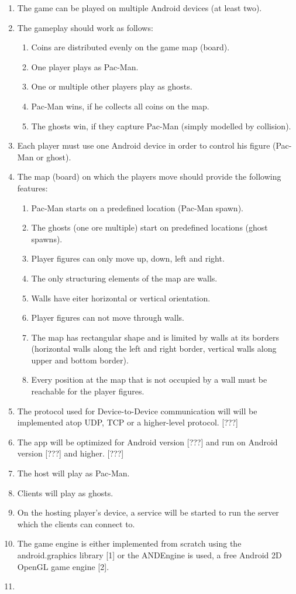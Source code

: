 \documentclass{report}
\begin{document}
\begin{enumerate}
	\item The game can be played on multiple Android devices (at least two).
	\item The gameplay should work as follows:
	\begin{enumerate}
		\item Coins are distributed evenly on the game map (board).
		\item One player plays as Pac-Man.
		\item One or multiple other players play as ghosts.
		\item Pac-Man wins, if he collects all coins on the map.
		\item The ghosts win, if they capture Pac-Man (simply modelled by collision).
	\end{enumerate}
	\item Each player must use one Android device in order to control his figure (Pac-Man or ghost).
	\item The map (board) on which the players move should provide the following features:
	\begin{enumerate}
		\item Pac-Man starts on a predefined location (Pac-Man spawn).
		\item The ghosts (one ore multiple) start on predefined locations (ghost spawns).
		\item Player figures can only move up, down, left and right.
		\item The only structuring elements of the map are walls.
		\item Walls have eiter horizontal or vertical orientation.
		\item Player figures can not move through walls.
		\item The map has rectangular shape and is limited by walls at its borders (horizontal walls along the left and right border, vertical walls along upper and bottom border).
		\item Every position at the map that is not occupied by a wall must be reachable for the player figures. 
	\end{enumerate}
	\item The protocol used for Device-to-Device communication will will be implemented atop UDP, TCP or a higher-level protocol. [???]
	\item The app will be optimized for Android version [???] and run on Android version [???] and higher. [???]
	\item The host will play as Pac-Man.
	\item Clients will play as ghosts.
	\item On the hosting player's device, a service will be started to run the server which the clients can connect to.
	\item The game engine is either implemented from scratch using the android.graphics library [1] or the ANDEngine is used, a free Android 2D OpenGL game engine [2].
	\item
	
\end{enumerate}
\end{document}
